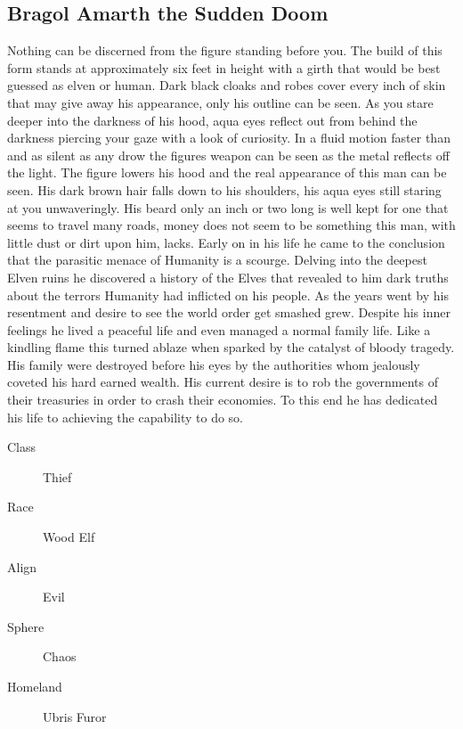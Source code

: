 \begin{multicols}{2}
\section{Bragol Amarth the Sudden Doom}
	Nothing can be discerned from the figure standing before you. The build of this form stands at approximately six feet in height with a girth that would be best guessed as elven or human. Dark black cloaks and robes cover every inch of skin that may give away his appearance, only his outline can be seen. As you stare deeper into the darkness of his hood, aqua eyes reflect out from behind the darkness piercing your gaze with a look of curiosity. In a fluid motion faster than and as silent as any drow the figures weapon can be seen as the metal reflects off the light. The figure lowers his hood and the real appearance of this man can be seen. His dark brown hair falls down to his shoulders, his aqua eyes still staring at you unwaveringly. His beard only an inch or two long is well kept for one that seems to travel many roads, money does not seem to be something this man, with little dust or dirt upon him, lacks.
	Early on in his life he came to the conclusion that the parasitic menace of Humanity is a scourge. Delving into the deepest Elven ruins he discovered a history of the Elves that revealed to him dark truths about the terrors Humanity had inflicted on his people. As the years went by his resentment and desire to see the world order get smashed grew. Despite his inner feelings he lived a peaceful life and even managed a normal family life. Like a kindling flame this turned ablaze when sparked by the catalyst of bloody tragedy. His family were destroyed before his eyes by the authorities whom jealously coveted his hard earned wealth. His current desire is to rob the governments of their treasuries in order to crash their economies.  To this end he has dedicated his life to achieving the capability to do so.
\begin{description}
  \item[Class] Thief
  \item[Race] Wood Elf
  \item[Align] Evil
  \item[Sphere] Chaos
  \item[Homeland] Ubris Furor
\end{description}


\end{multicols}

